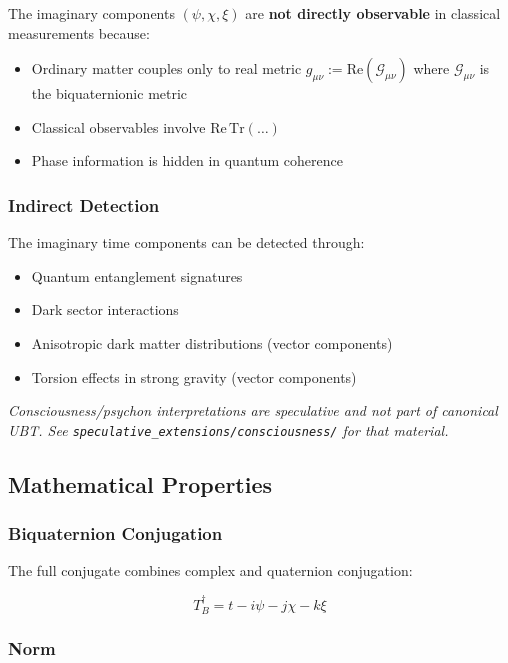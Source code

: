 The imaginary components $(\psi, \chi, \xi)$ are \textbf{not directly observable} in classical measurements because:
\begin{itemize}
    \item Ordinary matter couples only to real metric $g_{\mu\nu} := \text{Re}(\mathcal{G}_{\mu\nu})$ where $\mathcal{G}_{\mu\nu}$ is the biquaternionic metric
    \item Classical observables involve $\text{Re}\,\text{Tr}(\ldots)$
    \item Phase information is hidden in quantum coherence
\end{itemize}

\subsubsection{Indirect Detection}

The imaginary time components can be detected through:
\begin{itemize}
    \item Quantum entanglement signatures
    \item Dark sector interactions
    \item Anisotropic dark matter distributions (vector components)
    \item Torsion effects in strong gravity (vector components)
\end{itemize}

\textit{Consciousness/psychon interpretations are speculative and not part of canonical UBT.
See \texttt{speculative\_extensions/consciousness/} for that material.}

\subsection{Mathematical Properties}

\subsubsection{Biquaternion Conjugation}

The full conjugate combines complex and quaternion conjugation:

\begin{equation}
\label{eq:canonical:tb_conjugate}
T_B^\dagger = t - i\psi - j\chi - k\xi
\end{equation}

\subsubsection{Norm}

